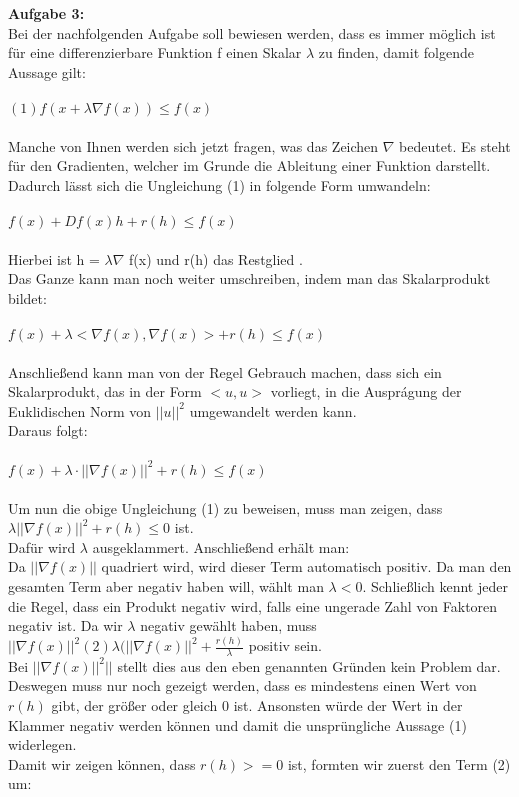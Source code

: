 \documentclass{article}
\begin{document}
\vspace{15pt}

\textbf{Aufgabe 3:}\\
Bei der nachfolgenden Aufgabe soll bewiesen werden, dass es immer möglich ist für eine differenzierbare Funktion f einen Skalar $\lambda$ zu finden, damit folgende Aussage gilt: \\ \\
$(1) f(x + \lambda \nabla f(x)) \leq f(x)$ \\ \\
Manche von Ihnen werden sich jetzt fragen, was das Zeichen $\nabla$ bedeutet. Es steht für den Gradienten, welcher im Grunde die Ableitung einer Funktion darstellt.
Dadurch lässt sich die Ungleichung (1) in folgende Form umwandeln: \\ \\
$f(x) + Df(x)h + r(h) \leq f(x)$  \\ \\
Hierbei ist h = $\lambda \nabla$ f(x) und r(h) das Restglied %
. \\
Das Ganze kann man noch weiter umschreiben, indem man das Skalarprodukt bildet: \\ \\
$f(x) + \lambda <\nabla f(x), \nabla f(x)> + r(h) \leq f(x)$ \\ \\
Anschließend kann man von der Regel Gebrauch machen, dass sich ein Skalarprodukt, das in der Form $<u,u>$ vorliegt, in die Auspr\'agung der Euklidischen Norm von $||u||^2$ umgewandelt werden kann. \\
Daraus folgt: \\ \\
$f(x) + \lambda \cdot || \nabla f(x)||^2 + r(h) \leq f(x)$ \\ \\
Um nun die obige Ungleichung (1) zu beweisen, muss man zeigen, dass \\ $\lambda ||\nabla f(x)||^2 + r(h) \leq 0$ ist.\\
Dafür wird $\lambda$ ausgeklammert. Anschließend erhält man:\\
Da $||\nabla f(x)||$ quadriert wird, wird dieser Term automatisch positiv. Da man den gesamten Term aber negativ haben will, wählt man $\lambda < 0.$ Schließlich kennt jeder die Regel, dass ein Produkt negativ wird, falls eine ungerade Zahl von Faktoren negativ ist. Da wir $\lambda$ negativ gewählt haben, muss \\ $||\nabla f(x)||^2$$(2) \lambda (||\nabla f(x)||^2 + \frac{r(h)}{\lambda}$ positiv sein.\\
Bei $||\nabla f(x)||^2||$ stellt dies aus den eben genannten Gr\"unden kein Problem dar. Deswegen muss nur noch gezeigt werden, dass es mindestens einen Wert von $r(h)$ gibt, der gr\"oßer oder gleich 0 ist. Ansonsten würde der Wert in der Klammer negativ werden k\"onnen und damit die unspr\"ungliche Aussage (1) widerlegen.\\
Damit wir zeigen k\"onnen, dass $r(h) >= 0$ ist, formten wir zuerst den Term (2) um:\\
\end{document}
